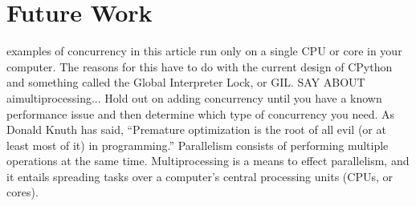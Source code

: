 \chapter{Future Work}
\label{sec:futurework}
\minitoc
\vspace*{1cm}

examples of concurrency in this article run only on a single CPU or core in your computer. The reasons for this have to do with the current design of CPython and something called the Global Interpreter Lock, or GIL. SAY ABOUT aimultiprocessing... Hold out on adding concurrency until you have a known performance issue and then determine which type of concurrency you need. As Donald Knuth has said, “Premature optimization is the root of all evil (or at least most of it) in programming.”
Parallelism consists of performing multiple operations at the same time. Multiprocessing is a means to effect parallelism, and it entails spreading tasks over a computer’s central processing units (CPUs, or cores). 
